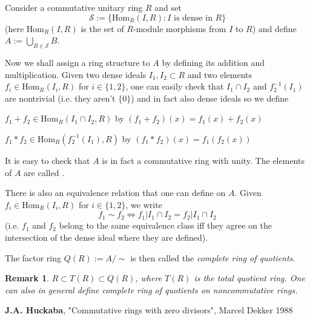 \documentclass[12pt]{article}
\newtheorem*{rem}{Remark}
\begin{document}
Consider a commutative unitary ring $R$ and set 
$$\mathcal S:=\{ \mathrm{Hom}_R(I,R) : I \textrm{ is dense in } R \}$$
(here $\mathrm{Hom}_R(I,R)$ is the set of $R$-module morphisms from $I$ to $R$) and define $A:=\bigcup_{B\in\mathcal S} B$.

Now we shall assign a ring structure to $A$ by defining its addition and multiplication. Given two dense ideals $I_1,I_2\subset R$ and two elements 
$f_i\in\mathrm{Hom}_R(I_i,R)$ for $i\in\{1,2\}$, one can easily check that $I_1\cap I_2$ and $f_2^{-1} (I_1)$ are nontrivial (i.e. they aren't $\{0\}$) and in fact also dense ideals so we define

$f_1+f_2\in\mathrm{Hom}_R(I_1\cap I_2,R)$ by $(f_1+f_2)(x)=f_1(x)+f_2(x)$

$f_1*f_2\in\mathrm{Hom}_R(f_2^{-1}(I_1),R)$ by $(f_1*f_2)(x)=f_1(f_2(x))$

It is easy to check that $A$ is in fact a commutative ring with unity.
The elements of $A$ are called .

There is also an equivalence relation that one can define on $A$.
Given $f_i\in \mathrm{Hom}_R(I_i,R)$ for $i\in\{1,2\}$, we write
$$f_1\sim f_2 \Leftrightarrow f_1|I_1\cap I_2 = f_2|I_1\cap I_2$$
(i.e. $f_1$ and $f_2$ belong to the same equivalence class iff they agree on the intersection of the dense ideal where they are defined). 

The factor ring $Q(R):=A/\sim$ is then called the \emph{complete ring of quotients}.

\begin{rem}
$R\subset T(R)\subset Q(R)$, where $T(R)$ is the total quotient ring. One can also in general define complete ring of quotients on noncommutative rings.
\end{rem}

\begin{thebibliography}{99}

\textbf{J.A. Huckaba},
"Commutative rings with zero divisors",
Marcel Dekker 1988

\end{thebibliography}
\end{document}
